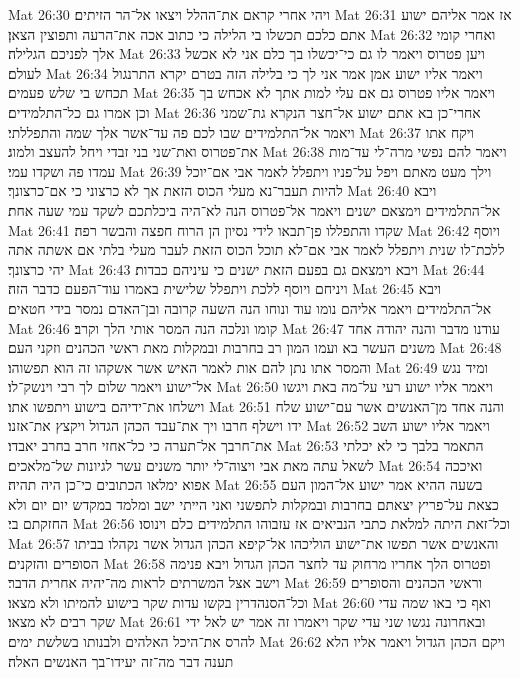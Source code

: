 Mat 26:30  ויהי אחרי קראם את־ההלל ויצאו אל־הר הזיתים׃
Mat 26:31  אז אמר אליהם ישוע אתם כלכם תכשלו בי הלילה כי כתוב אכה את־הרעה ותפוצין הצאן׃
Mat 26:32  ואחרי קומי אלך לפניכם הגלילה׃
Mat 26:33  ויען פטרוס ויאמר לו גם כי־יכשלו בך כלם אני לא אכשל לעולם׃
Mat 26:34  ויאמר אליו ישוע אמן אמר אני לך כי בלילה הזה בטרם יקרא התרנגול תכחש בי שלש פעמים׃
Mat 26:35  ויאמר אליו פטרוס גם אם עלי למות אתך לא אכחש בך וכן אמרו גם כל־התלמידים׃
Mat 26:36  אחרי־כן בא אתם ישוע אל־חצר הנקרא גת־שמני ויאמר אל־התלמידים שבו לכם פה עד־אשר אלך שמה והתפללתי׃
Mat 26:37  ויקח אתו את־פטרוס ואת־שני בני זבדי ויחל להעצב ולמוג׃
Mat 26:38  ויאמר להם נפשי מרה־לי עד־מות עמדו פה ושקדו עמי׃
Mat 26:39  וילך מעט מאתם ויפל על־פניו ויתפלל לאמר אבי אם־יוכל להיות תעבר־נא מעלי הכוס הזאת אך לא כרצוני כי אם־כרצונך׃
Mat 26:40  ויבא אל־התלמידים וימצאם ישנים ויאמר אל־פטרוס הנה לא־היה ביכלתכם לשקד עמי שעה אחת׃
Mat 26:41  שקדו והתפללו פן־תבאו לידי נסיון הן הרוח חפצה והבשר רפה׃
Mat 26:42  ויוסף ללכת־לו שנית ויתפלל לאמר אבי אם־לא תוכל הכוס הזאת לעבר מעלי בלתי אם אשתה אתה יהי כרצונך׃
Mat 26:43  ויבא וימצאם גם בפעם הזאת ישנים כי עיניהם כבדות׃
Mat 26:44  ויניחם ויוסף ללכת ויתפלל שלישית באמרו עוד־הפעם כדבר הזה׃
Mat 26:45  ויבא אל־התלמידים ויאמר אליהם נומו עוד ונוחו הנה השעה קרובה ובן־האדם נמסר בידי חטאים׃
Mat 26:46  קומו ונלכה הנה המסר אותי הלך וקרב׃
Mat 26:47  עודנו מדבר והנה יהודה אחד משנים העשר בא ועמו המון רב בחרבות ובמקלות מאת ראשי הכהנים וזקני העם׃
Mat 26:48  והמסר אתו נתן להם אות לאמר האיש אשר אשקהו זה הוא תפשוהו׃
Mat 26:49  ומיד נגש אל־ישוע ויאמר שלום לך רבי וינשק־לו׃
Mat 26:50  ויאמר אליו ישוע רעי על־מה באת ויגשו וישלחו את־ידיהם בישוע ויתפשו אתו׃
Mat 26:51  והנה אחד מן־האנשים אשר עם־ישוע שלח ידו וישלף חרבו ויך את־עבד הכהן הגדול ויקצץ את־אזנו׃
Mat 26:52  ויאמר אליו ישוע השב את־חרבך אל־תערה כי כל־אחזי חרב בחרב יאבדו׃
Mat 26:53  התאמר בלבך כי לא יכלתי לשאל עתה מאת אבי ויצוה־לי יותר משנים עשר לגיונות של־מלאכים׃
Mat 26:54  ואיככה אפוא ימלאו הכתובים כי־כן היה תהיה׃
Mat 26:55  בשעה ההיא אמר ישוע אל־המון העם כצאת על־פריץ יצאתם בחרבות ובמקלות לתפשני ואני הייתי ישב ומלמד במקדש יום יום ולא החזקתם בי׃
Mat 26:56  וכל־זאת היתה למלאת כתבי הנביאים אז עזבוהו התלמידים כלם וינוסו׃
Mat 26:57  והאנשים אשר תפשו את־ישוע הוליכהו אל־קיפא הכהן הגדול אשר נקהלו בביתו הסופרים והזקנים׃
Mat 26:58  ופטרוס הלך אחריו מרחוק עד לחצר הכהן הגדול ויבא פנימה וישב אצל המשרתים לראות מה־יהיה אחרית הדבר׃
Mat 26:59  וראשי הכהנים והסופרים וכל־הסנהדרין בקשו עדות שקר בישוע להמיתו ולא מצאו׃
Mat 26:60  ואף כי באו שמה עדי שקר רבים לא מצאו׃
Mat 26:61  ובאחרונה נגשו שני עדי שקר ויאמרו זה אמר יש לאל ידי להרס את־היכל האלהים ולבנותו בשלשת ימים׃
Mat 26:62  ויקם הכהן הגדול ויאמר אליו הלא תענה דבר מה־זה יעידו־בך האנשים האלה׃
